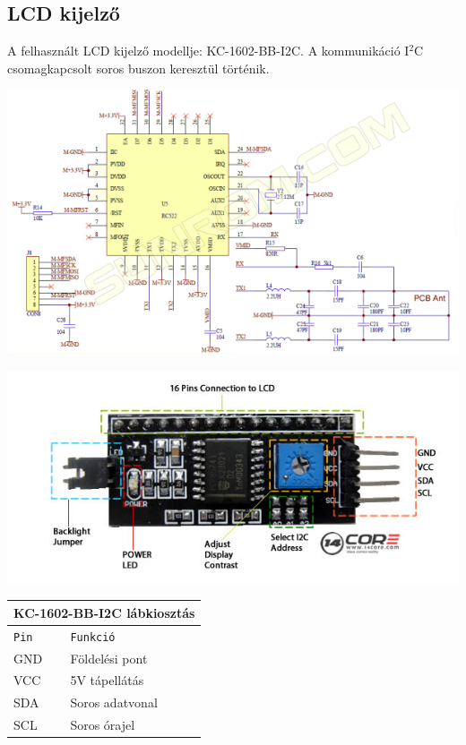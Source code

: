 \documentclass[11pt, a4paper]{article}
\begin{document}
		\subsection{LCD kijelző}
		\begin{flushleft}
			\justifying
			A felhasznált LCD kijelző modellje: KC-1602-BB-I2C. A kommunikáció I$^2$C csomagkapcsolt soros buszon keresztül történik.
		\end{flushleft}
		\begin{minipage}{\linewidth}
			\centering
			\includegraphics[width=0.7\linewidth]{img/rc552_shematic}
			\label{fig:4lcdshematic}
		\end{minipage}
					\begin{minipage}{\linewidth}
			\centering
			\includegraphics[width=0.7\linewidth]{img/i2c_pinout}
			\label{fig:5lcdpinout}
		\end{minipage}
		\begin{minipage}{.5\textwidth}
			\fontsize{10}{16}\selectfont
			\centering
			\begin{tabular}{||m{6em} m{8em}||}
				\hline
				\multicolumn{2}{|c|}{\textbf{KC-1602-BB-I2C lábkiosztás}} \\
				\hline
				\texttt{Pin} & \texttt{Funkció} \\
				\hline\hline
				GND & Földelési pont \\ 
				\hline
				VCC & 5V tápellátás \\ 
				\hline
				SDA & Soros adatvonal \\ 
				\hline
				SCL & Soros órajel \\
				\hline
			\end{tabular}
			\label{table:lcdpinout}
		\end{minipage}
\end{document}
